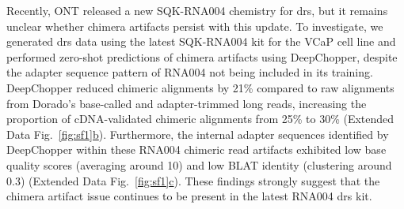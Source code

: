 \documentclass[pdflatex,sn-nature, lineno]{sn-jnl}%
\newcommand{\edfigref}[2]{Extended Data Fig.~\hyperref[#1]{\ref*{#1}#2}}
\theoremstyle{thmstyleone}%
\theoremstyle{thmstyletwo}%
\theoremstyle{thmstylethree}%
\begin{document}
Recently, ONT released a new SQK-RNA004 chemistry for \gls{drs}, but it remains unclear whether chimera artifacts persist with this update. To investigate, we generated \gls{drs} data using the latest SQK-RNA004 kit for the VCaP cell line and performed zero-shot predictions of chimera artifacts using DeepChopper, despite the adapter sequence pattern of RNA004 not being included in its training. DeepChopper reduced chimeric alignments by 21\% compared to raw alignments from Dorado’s base-called and adapter-trimmed long reads, increasing the proportion of cDNA-validated chimeric alignments from 25\% to 30\% (\edfigref{fig:sf1}{b}). Furthermore, the internal adapter sequences identified by DeepChopper within these RNA004 chimeric read artifacts exhibited low base quality scores (averaging around 10) and low BLAT identity (clustering around 0.3) (\edfigref{fig:sf1}{c}). These findings strongly suggest that the chimera artifact issue continues to be present in the latest RNA004 \gls{drs} kit.
\end{document}
